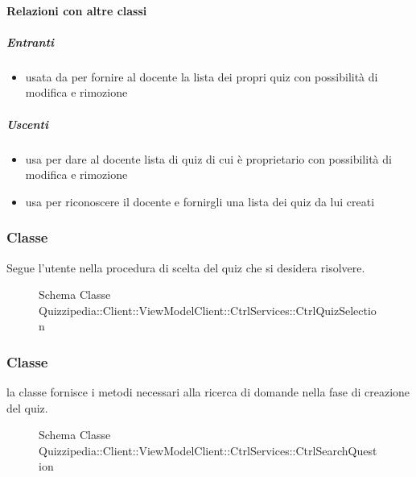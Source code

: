 \paragraph{Relazioni con altre classi}
\subparagraph{Entranti}
\begin{itemize}
\item usata da  per fornire al docente la lista dei propri quiz con possibilità di modifica e rimozione
\end{itemize}
\subparagraph{Uscenti}
\begin{itemize}
\item usa  per dare al docente lista di quiz di cui è proprietario con possibilità di modifica e rimozione
\item usa  per riconoscere il docente e fornirgli una lista dei quiz da lui creati
\end{itemize}
\subsubsection{Classe }
Segue l'utente nella procedura di scelta del quiz che si desidera risolvere.
\begin{figure}[H]
\centering
\noindent{}
\caption[Schema Classe CtrlQuizSelection]{Schema Classe Quizzipedia::Client::ViewModelClient::CtrlServices::CtrlQuizSelection}
\end{figure}
\subsubsection{Classe }
la classe fornisce i metodi necessari alla ricerca di domande nella fase di creazione del quiz.
\begin{figure}[H]
\centering
\noindent{}
\caption[Schema Classe CtrlSearchQuestion]{Schema Classe Quizzipedia::Client::ViewModelClient::CtrlServices::CtrlSearchQuestion}
\end{figure}

